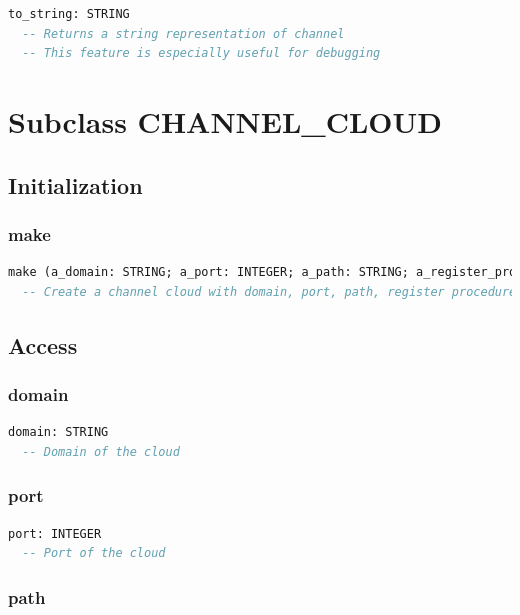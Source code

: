 \begin{lstlisting}[language=Eiffel]
to_string: STRING
  -- Returns a string representation of channel
  -- This feature is especially useful for debugging
\end{lstlisting}


\section{Subclass CHANNEL\_CLOUD}
\label{sec:channel-cloud}

\subsection{Initialization}
\label{sec:channel-cloud-initialization}

\subsubsection{make}

\begin{lstlisting}[language=Eiffel]
make (a_domain: STRING; a_port: INTEGER; a_path: STRING; a_register_procedure: STRING; a_protocol: STRING)
  -- Create a channel cloud with domain, port, path, register procedure and protocol
\end{lstlisting}

\subsection{Access}
\label{sec:channel-cloud-access}

\subsubsection{domain}

\begin{lstlisting}[language=Eiffel]
domain: STRING
  -- Domain of the cloud
\end{lstlisting}

\subsubsection{port}

\begin{lstlisting}[language=Eiffel]
port: INTEGER
  -- Port of the cloud
\end{lstlisting}

\subsubsection{path}

